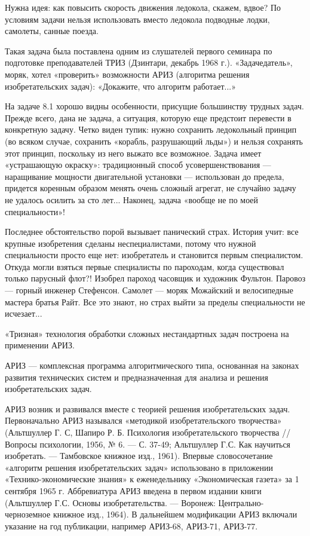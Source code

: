 Нужна идея: как повысить скорость движения ледокола, скажем, вдвое? По
условиям задачи  нельзя использовать вместо ледокола  подводные лодки,
самолеты, санные поезда.

Такая  задача была  поставлена  одним из  слушателей первого  семинара
по  подготовке  преподавателей  ТРИЗ   (Дзинтари,  декабрь  1968  г.).
«Задачедатель», моряк,  хотел «проверить» возможности  АРИЗ (алгоритма
решения изобретательских задач): «Докажите, что алгоритм работает...»

На задаче  8.1 хорошо видны особенности,  присущие большинству трудных
задач. Прежде всего, дана не задача, а ситуация, которую еще предстоит
перевести  в конкретную  задачу.  Четко виден  тупик: нужно  сохранить
ледокольный принцип (во всяком случае, сохранить «корабль, разрушающий
льды») и нельзя  сохранять этот принцип, поскольку из  него выжато все
возможное.  Задача имеет  «устрашающую  окраску»: традиционный  способ
усовершенствования  — наращивание  мощности  двигательной установки  —
использован до предела, придется коренным образом менять очень сложный
агрегат, не случайно задачу не  удалось осилить за сто лет... Наконец,
задача «вообще не по моей специальности»!

Последнее  обстоятельство  порой  вызывает панический  страх.  История
учит:  все крупные  изобретения  сделаны  неспециалистами, потому  что
нужной специальности просто еще  нет: изобретатель и становится первым
специалистом. Откуда  могли взяться  первые специалисты  по пароходам,
когда существовал  только парусный  флот?! Изобрел пароход  часовщик и
художник Фультон. Паровоз — горный  инженер Стефенсон. Самолет — моряк
Можайский и велосипедные мастера братья  Райт. Все это знают, но страх
выйти за пределы специальности не исчезает...

«Тризная» технология  обработки сложных нестандартных  задач построена
на применении АРИЗ.

АРИЗ  — комплексная  программа  алгоритмического  типа, основанная  на
законах развития  технических систем  и предназначенная для  анализа и
решения изобретательских задач.

АРИЗ  возник и  развивался вместе  с теорией  решения изобретательских
задач.  Первоначально  АРИЗ   назывался  «методикой  изобретательского
творчества»   (Альтшуллер    Г.   С,    Шапиро   Р.    Б.   Психология
изобретательского творчества  // Вопросы психологии,  1956, № 6.  — С.
37-49; Альтшуллер Г.С. Как  научиться изобретать. — Тамбовское книжное
изд., 1961). Впервые словосочетание «алгоритм решения изобретательских
задач»  использовано   в  приложении   «Технико-экономические  знания»
к  еженедельнику   «Экономическая  газета»  за  1   сентября  1965  г.
Аббревиатура  АРИЗ введена  в  первом издании  книги (Альтшуллер  Г.С.
Основы  изобретательства.  — Воронеж:  Центрально-черноземное  книжное
изд., 1964).  В дальнейшем модификации  АРИЗ включали указание  на год
публикации, например АРИЗ-68, АРИЗ-71, АРИЗ-77.

